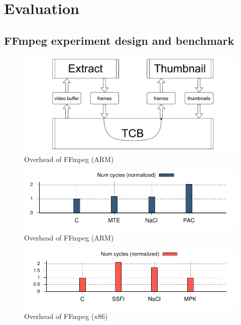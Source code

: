 \chapter{Evaluation} 

\label{Chapter5}


\section{FFmpeg experiment design and benchmark}

\begin{figure}[!htbp]
	\includegraphics[width=1.0\columnwidth]{figures/ffmpeg-pinpeline.pdf}
\caption{Overhead of FFmpeg (ARM)}
	\label{fig:ffmpeg-arm}
\end{figure}

\begin{figure}[!htbp]
	\includegraphics[width=1.0\columnwidth]{figures/ffmpeg-arm.pdf}
\caption{Overhead of FFmpeg (ARM)}
	\label{fig:ffmpeg-arm}
\end{figure}

\begin{figure}[!htbp]
	\includegraphics[width=1.0\columnwidth]{figures/ffmpeg-x86.pdf}
\caption{Overhead of FFmpeg (x86)}
	\label{fig:ffmpeg-x86}
\end{figure}

